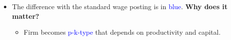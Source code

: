 \documentclass[aspectratio=169]{beamer} %
\begin{document}
\begin{frame}
{\vspace{2mm}

\begin{itemize}
    \item The difference with the standard wage posting is in \textcolor{blue}{blue}. \textbf{Why does it matter?} 
    \begin{itemize}
        \item Firm becomes \textcolor{blue}{p-k-type} that depends on productivity and capital. 
    \end{itemize}
\end{itemize}}


\end{frame}

\end{document}
